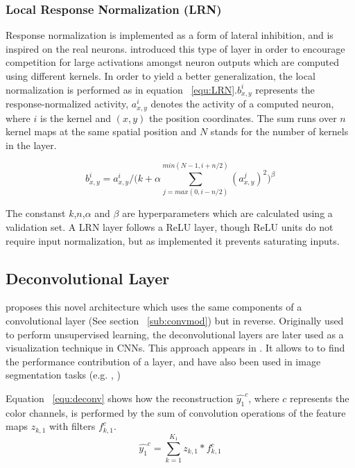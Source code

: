 \subsubsection{Local Response Normalization (LRN)}
\label{subsub:LRN}
Response normalization is implemented as a form of lateral inhibition, and is inspired on the real neurons. \textcite{hinton2012improving} introduced this type of layer in order to encourage competition for large activations amongst neuron outputs which are computed using different kernels. In order to yield a better generalization, the local normalization is performed as in equation ~\ref{equ:LRN}.$b^i_{x,y}$ represents the  response-normalized activity, $a^i_{x,y}$ denotes the activity of a computed neuron, where $i$ is the kernel and $(x,y)$ the position coordinates. The sum runs over $n$ kernel maps at the same spatial position and $N$ stands for the number of kernels in the layer.  

\begin{equation}
 b^i_{x,y} =  a^i_{x,y}/ \bigg( k+\alpha\sum\limits_{j=max(0,i-n/2)}^{min(N-1,i+n/2)}(a^j_{x,y})^2 \bigg) ^\beta
 \label{equ:LRN}
\end{equation}

The constanst $k$,$n$,$\alpha$ and $\beta$ are hyperparameters which are calculated using a validation set. A LRN layer follows a ReLU layer, though ReLU units do not require input normalization, but as \textcite{Krizhevsky_imagenetclassification} implemented it prevents saturating inputs.
  
\subsection{Deconvolutional Layer}
\textcite{zeiler2011adaptive} proposes this novel architecture which uses the same components of a convolutional layer (See section ~\ref{sub:convmod}) but in reverse. Originally used to perform unsupervised learning, the deconvolutional layers are later used as a visualization technique in CNNs. This approach appears in \textcite{zeiler2014visualizing}. It allows to to find the performance contribution of a layer, and have also been used in image segmentation tasks (e.g. \textcite{long2014fully}, \textcite{noh2015learning}) 

Equation ~\ref{equ:deconv} shows how the reconstruction $\hat{y_1}^c$, where $c$ represents the color channels, is performed by the sum of  convolution operations of the feature maps $z_{k,1}$ with filters $f^c_{k,1}$. 
\begin{equation}
 \hat{y_1}^c = \sum\limits_{k=1}^{K_1}z_{k,1}\ast f^c_{k,1}
 \label{equ:deconv}
\end{equation}


